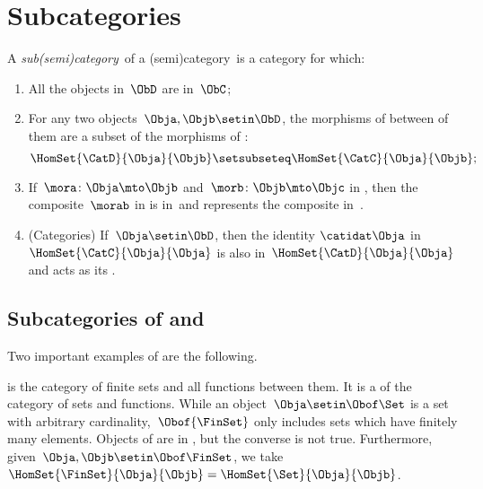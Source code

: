 
\section{Subcategories}
\label{sec:subcategories}


\begin{ctdefinition}[Subcategory]
    \label{def:subcategory}
    A \emph{sub(semi)category}~\CatD of a (semi)category~\CatC is a category for which:
    \begin{enumerate}
        \item All the objects in~$\ObD$ are in~$\ObC$;
        \item For any two objects~$\Obja,\Objb\setin \ObD$,
              the morphisms of \CatD between of them are a subset of the morphisms of \CatC:
              \begin{equation}
                  \HomSet{\CatD}{\Obja}{\Objb}\setsubseteq \HomSet{\CatC}{ \Obja}{\Objb};
              \end{equation}
        \item If~$\mora \colon \Obja \mto \Objb$ and~$\morb\colon \Objb\mto \Objc$ in \CatD, then the composite~$\morab$ in \CatC is in~\CatD and represents the composite in~\CatD.
        \item (Categories) If~$\Obja\setin \ObD$, then the identity $\catidat\Obja$ in $\HomSet{\CatC}{\Obja}{\Obja}$ is also in~$\HomSet{\CatD}{\Obja}{\Obja}$ and acts as its .
    \end{enumerate}
\end{ctdefinition}

\subsection{Subcategories of \Rel and \Set}

Two important examples of  are the following.

\begin{example}[\FinSet]
    \label{ex:FinSet}
    \FinSet is the category of finite sets and all functions between them.
    It is a  of the category \Set of sets and functions.
    While an object~$\Obja \setin \Obof\Set$ is a set with arbitrary cardinality,~$\Obof{\FinSet}$ only includes sets which have finitely many elements.
    Objects of \FinSet are in \Set, but the converse is not true.
    Furthermore, given~$\Obja,\Objb\setin \Obof\FinSet$, we take~$\HomSet{\FinSet}{\Obja}{\Objb} =\HomSet{\Set}{\Obja}{\Objb}$.
\end{example}

